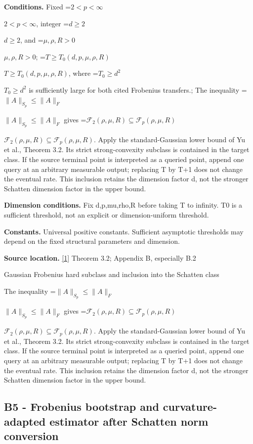 \documentclass[10pt,a4paper]{article}
\newcommand{\AtlasMath}[1]{\par\begingroup\centering\setbox0=\hbox{$\displaystyle #1$}\ifdim\wd0>1.4\linewidth\typeout{ATLAS WIDE FORMULA: \the\wd0}\fi\ifdim\wd0>\linewidth\resizebox{\linewidth}{!}{\box0}\else\box0\fi\par\endgroup}
\newcommand{\AtlasInlineMath}[1]{\begingroup\setbox0=\hbox{$#1$}\ifdim\wd0>.4\linewidth\endgroup\AtlasMath{#1}\else\endgroup$#1$\fi}
\begin{document}
\textbf{Conditions.} Fixed \AtlasInlineMath{2<p<\infty}, integer \AtlasInlineMath{d\ge2}, and \AtlasInlineMath{\mu,\rho,R>0}; \AtlasInlineMath{T\ge T_0(d,p,\mu,\rho,R)}, where \AtlasInlineMath{T_0\ge d^2} is sufficiently large for both cited Frobenius transfers.; The inequality \AtlasInlineMath{\|A\|_{S_p}\le\|A\|_F} gives \AtlasInlineMath{\mathcal F_2(\rho,\mu,R)\subseteq\mathcal F_p(\rho,\mu,R)}. Apply the standard-Gaussian lower bound of Yu et al., Theorem 3.2. Its strict strong-convexity subclass is contained in the target class. If the source terminal point is interpreted as a queried point, append one query at an arbitrary measurable output; replacing T by T+1 does not change the eventual rate. This inclusion retains the dimension factor d, not the stronger Schatten dimension factor in the upper bound.



\textbf{Dimension conditions.} Fix d,p,mu,rho,R before taking T to infinity. T0 is a sufficient threshold, not an explicit or dimension-uniform threshold.



\textbf{Constants.} Universal positive constants. Sufficient asymptotic thresholds may depend on the fixed structural parameters and dimension.



\textbf{Source location.} \href{https://papers.nips.cc/paper_files/paper/2024/file/b444ad72520a5f5c467343be88e352ed-Paper-Conference.pdf}{[1]} Theorem 3.2; Appendix B, especially B.2



Gaussian Frobenius hard subclass and inclusion into the Schatten class



The inequality \AtlasInlineMath{\|A\|_{S_p}\le\|A\|_F} gives \AtlasInlineMath{\mathcal F_2(\rho,\mu,R)\subseteq\mathcal F_p(\rho,\mu,R)}. Apply the standard-Gaussian lower bound of Yu et al., Theorem 3.2. Its strict strong-convexity subclass is contained in the target class. If the source terminal point is interpreted as a queried point, append one query at an arbitrary measurable output; replacing T by T+1 does not change the eventual rate. This inclusion retains the dimension factor d, not the stronger Schatten dimension factor in the upper bound.



\subsection{B5 - Frobenius bootstrap and curvature-adapted estimator after Schatten norm conversion}
\end{document}
